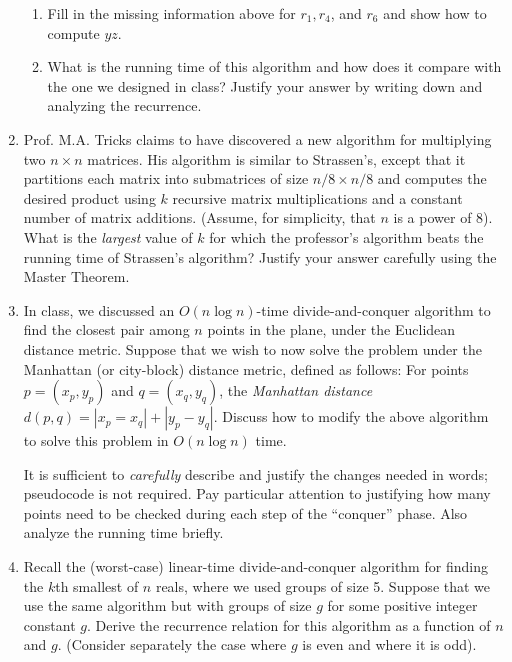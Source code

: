 \documentclass[a4paper]{article}
\begin{document}
\begin{enumerate}
\begin{enumerate}
      \item Fill in the missing information above for $r_1, r_4$, and $r_6$ and show how to compute $yz$.

      \item What is the running time of this algorithm and how does it compare with the one we designed in class? Justify your answer by writing down
        and analyzing the recurrence.
    \end{enumerate}

  \item Prof. M.A. Tricks claims to have discovered a new algorithm for multiplying two $n \times n$ matrices. His algorithm is similar to Strassen's,
    except that it partitions each matrix into submatrices of size $n/8 \times n/8$ and computes the desired product using $k$ recursive matrix
    multiplications and a constant number of matrix additions. (Assume, for simplicity, that $n$ is a power of 8). What is the \emph{largest} value of
    $k$ for which the professor's algorithm beats the running time of Strassen's algorithm? Justify your answer carefully using the Master Theorem.

  \item In class, we discussed an $O(n \log n)$-time divide-and-conquer algorithm to find the closest pair among $n$ points in the plane, under the
    Euclidean distance metric. Suppose that we wish to now solve the problem under the Manhattan (or city-block) distance metric, defined as follows:
    For points $p = (x_p, y_p)$ and $q = (x_q, y_q)$, the \emph{Manhattan distance} $d(p,q) = | x_p = x_q| + |y_p - y_q|$. Discuss how to modify the
    above algorithm to solve this problem in $O ( n \log n )$ time.

    It is sufficient to \emph{carefully} describe and justify the changes needed in words; pseudocode is not required. Pay particular attention to
    justifying how many points need to be checked during each step of the ``conquer'' phase. Also analyze the running time briefly.

  \item Recall the (worst-case) linear-time divide-and-conquer algorithm for finding the $k$th smallest of $n$ reals, where we used groups of size 5.
    Suppose that we use the same algorithm but with groups of size $g$ for some positive integer constant $g$. Derive the recurrence relation for this
    algorithm as a function of $n$ and $g$. (Consider separately the case where $g$ is even and where it is odd).


\end{enumerate}
\end{document}
